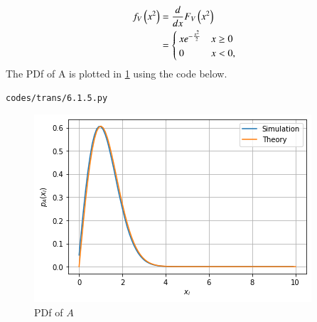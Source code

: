 \begin{enumerate}[label=\thesubsection.\arabic*.,ref=\thesubsection.\theenumi]
\begin{align}
f_V\left(x^2\right) &= \frac{d}{dx}F_V\left(x^2\right)
\\
&=
\begin{cases}
x e^{- \frac{x^2}{2}} & x \geq 0 \\
0 & x < 0,
\end{cases}
\end{align}
%
The PDf of A is plotted in \ref{fig:probman_trans_pdf_A_theory} using the code below.
\begin{lstlisting}
codes/trans/6.1.5.py
\end{lstlisting}
\begin{figure}[!ht]
\centering
\includegraphics[width=\columnwidth]{./figs/trans/6.1.5.png}
\caption{PDf of $A$}
\label{fig:probman_trans_pdf_A_theory}
\end{figure}
\end{enumerate}

%
